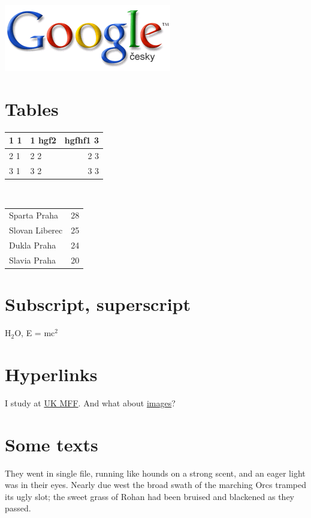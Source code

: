 \documentclass[a4paper,11pt]{article}
\begin{document}
\includegraphics{logo.png}

\section{Tables}
\begin{tabular}{|l|p{5cm}|r|}
\hline 
1 1 & 1 hgf2 & hgfhf1 3 \\ 
\hline
2 1 & 2 2 & 2 3 \\ 
\hline
3 1 & 3 2 & 3 3 \\ 
\hline

\end{tabular}
\\
\begin{tabular}{p{10cm}|p{3cm}}
Sparta Praha & 28 \\ 
Slovan Liberec & 25 \\ 
Dukla Praha & 24 \\ 
Slavia Praha & 20
\end{tabular}

\section{Subscript, superscript}

H$_2$O, E = mc$^2$

\section{Hyperlinks}

I study at \href{http://www.mff.cuni.cz}{UK MFF}. And     what about \hyperlink{img}{images}?

\section{Some texts}


\begin{center}
 They went in single file, running like hounds on a strong scent, and an eager light was in their eyes. Nearly due west the broad swath of the marching \scriptsize Orcs tramped \normalsize its ugly slot; the sweet grass of Rohan had been bruised and blackened as they passed. 
\end{center}
\end{document}
